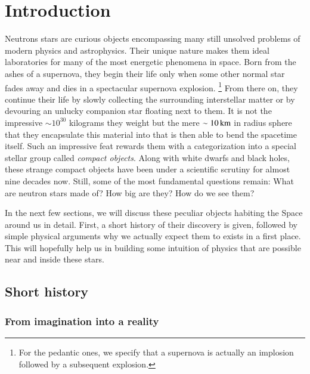 \chapter{Introduction} 
Neutrons stars are curious objects encompassing many still unsolved problems of modern physics and astrophysics.
Their unique nature makes them ideal laboratories for many of the most energetic phenomena in space.
Born from the ashes of a supernova, they begin their life only when some other normal star fades away and dies in a spectacular supernova explosion.%
\footnote{ For the pedantic ones, we specify that a supernova is actually an implosion followed by a subsequent explosion.}
From there on, they continue their life by slowly collecting the surrounding interstellar matter or by devouring an unlucky companion star floating next to them.
It is not the impressive $\sim 10^{30}$ kilograms they weight but the mere $\sim 10 \, \mathrm{km}$ in radius sphere that they encapsulate this material into that is then able to bend the spacetime itself.
Such an impressive feat rewards them with a categorization into a special stellar group called \textit{compact objects}.
Along with white dwarfs and black holes, these strange compact objects have been under a scientific scrutiny for almost nine decades now.
Still, some of the most fundamental questions remain:
What are neutron stars made of?
How big are they?
How do we see them?

In the next few sections, we will discuss these peculiar objects habiting the Space around us in detail.
First, a short history of their discovery is given, followed by simple physical arguments why we actually expect them to exists in a first place.
This will hopefully help us in building some intuition of physics that are possible near and inside these stars.


\section{Short history}
\subsection{From imagination into a reality}


